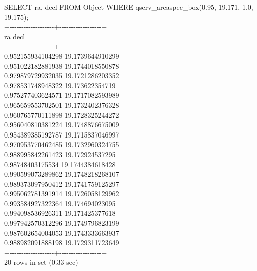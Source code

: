 SELECT ra, decl FROM Object WHERE qserv\_areaspec\_box(0.95, 19.171,
1.0, 19.175);\\
+-\/-\/-\/-\/-\/-\/-\/-\/-\/-\/-\/-\/-\/-\/-\/-\/-\/-\/-+-\/-\/-\/-\/-\/-\/-\/-\/-\/-\/-\/-\/-\/-\/-\/-\/-\/-+\\
\textbar{} ra \textbar{} decl \textbar{}\\
+-\/-\/-\/-\/-\/-\/-\/-\/-\/-\/-\/-\/-\/-\/-\/-\/-\/-\/-+-\/-\/-\/-\/-\/-\/-\/-\/-\/-\/-\/-\/-\/-\/-\/-\/-\/-+\\
\textbar{} 0.952155934104298 \textbar{} 19.1739644910299 \textbar{}\\
\textbar{} 0.951022182881938 \textbar{} 19.1744018550878 \textbar{}\\
\textbar{} 0.979879729932035 \textbar{} 19.1721286203352 \textbar{}\\
\textbar{} 0.978531748948322 \textbar{} 19.173622354719 \textbar{}\\
\textbar{} 0.975277403624571 \textbar{} 19.1717082593989 \textbar{}\\
\textbar{} 0.965659553702501 \textbar{} 19.1732402376328 \textbar{}\\
\textbar{} 0.960765770111898 \textbar{} 19.1728325244272 \textbar{}\\
\textbar{} 0.956040810381224 \textbar{} 19.1748876675009 \textbar{}\\
\textbar{} 0.954389385192787 \textbar{} 19.1715837046997 \textbar{}\\
\textbar{} 0.970953770462485 \textbar{} 19.1732960324755 \textbar{}\\
\textbar{} 0.988995842261423 \textbar{} 19.172924537295 \textbar{}\\
\textbar{} 0.98748403175534 \textbar{} 19.1744384618428 \textbar{}\\
\textbar{} 0.990599073289862 \textbar{} 19.1748218268107 \textbar{}\\
\textbar{} 0.989373097950412 \textbar{} 19.1741759125297 \textbar{}\\
\textbar{} 0.995062781391914 \textbar{} 19.1726058129962 \textbar{}\\
\textbar{} 0.993584927322364 \textbar{} 19.174694023095 \textbar{}\\
\textbar{} 0.994098536926311 \textbar{} 19.171425377618 \textbar{}\\
\textbar{} 0.997942570312296 \textbar{} 19.1749796823199 \textbar{}\\
\textbar{} 0.987602654004053 \textbar{} 19.1743333663937 \textbar{}\\
\textbar{} 0.988982091888198 \textbar{} 19.1729311723649 \textbar{}\\
+-\/-\/-\/-\/-\/-\/-\/-\/-\/-\/-\/-\/-\/-\/-\/-\/-\/-\/-+-\/-\/-\/-\/-\/-\/-\/-\/-\/-\/-\/-\/-\/-\/-\/-\/-\/-+\\
20 rows in set (0.33 sec)

